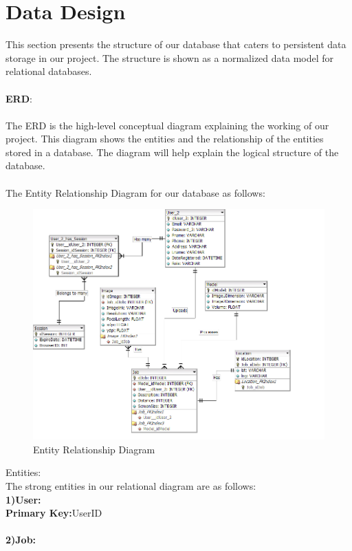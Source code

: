 \newpage
\section{Data Design}

This section presents the structure of our database that caters to persistent data storage in our project. The structure is shown as a normalized data model for relational databases. \\
\\
\textbf{ERD}: \\
\\
The ERD is the high-level conceptual diagram explaining the working of our project. This diagram shows the entities and the relationship of the entities stored in a database. The diagram will help explain the logical structure of the database.\\
\\The Entity Relationship Diagram for our database as follows:
\begin{figure}[!hb]
   \centering
   \includegraphics[scale=0.4]{images/ERD.png}
    \caption{Entity Relationship Diagram}\label{fig:picture}
\end{figure}
\newpage
Entities:\\
The strong entities in our relational diagram are as follows:\\
\textbf{1)User:}\\
\textbf{Primary Key:}UserID\\
\\
\textbf{2)Job:}\\

